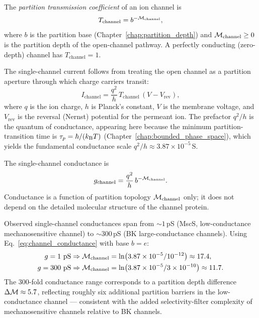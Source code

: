 \begin{definition}
\label{def:transmission_coefficient}
The \emph{partition transmission coefficient} of an ion channel is
\begin{equation}
  T_{\mathrm{channel}} = b^{-\mathcal{M}_{\mathrm{channel}}},
  \label{eq:transmission_coefficient}
\end{equation}
where $b$ is the partition base (Chapter~\ref{chap:partition_depth}) and
$\mathcal{M}_{\mathrm{channel}} \geq 0$ is the partition depth of the open-channel
pathway. A perfectly conducting (zero-depth) channel has $T_{\mathrm{channel}} = 1$.
\end{definition}

The single-channel current follows from treating the open channel as a partition
aperture through which charge carriers transit:
\begin{equation}
  \boxed{I_{\mathrm{channel}}
    = \frac{q^2}{h}\,T_{\mathrm{channel}}\,(V - V_{\mathrm{rev}}),}
  \label{eq:channel_current}
\end{equation}
where $q$ is the ion charge, $h$ is Planck's constant, $V$ is the membrane
voltage, and $V_{\mathrm{rev}}$ is the reversal (Nernst) potential for the
permeant ion. The prefactor $q^2/h$ is the quantum of conductance, appearing
here because the minimum partition-transition time is
$\tau_p = \hbar/(k_{\mathrm{B}} T)$ (Chapter~\ref{chap:bounded_phase_space}), which
yields the fundamental conductance scale
$q^2/h \approx 3.87 \times 10^{-5}$\,S.

\begin{corollary}
\label{cor:conductance}
The single-channel conductance is
\begin{equation}
  g_{\mathrm{channel}} = \frac{q^2}{h}\,b^{-\mathcal{M}_{\mathrm{channel}}}.
  \label{eq:channel_conductance}
\end{equation}
Conductance is a function of partition topology $\mathcal{M}_{\mathrm{channel}}$
only; it does not depend on the detailed molecular structure of the channel
protein.
\end{corollary}

\begin{remark}
Observed single-channel conductances span from $\sim 1$\,pS (MscS,
low-conductance mechanosensitive channel) to $\sim 300$\,pS (BK large-conductance
channels). Using Eq.~\eqref{eq:channel_conductance} with base $b = e$:
\begin{align}
  g = 1\ \mathrm{pS}   &\Rightarrow \mathcal{M}_{\mathrm{channel}} = \ln(3.87 \times 10^{-5}/10^{-12}) \approx 17.4,\\
  g = 300\ \mathrm{pS} &\Rightarrow \mathcal{M}_{\mathrm{channel}} = \ln(3.87 \times 10^{-5}/3\times10^{-10}) \approx 11.7.
\end{align}
The 300-fold conductance range corresponds to a partition depth difference
$\Delta\mathcal{M} \approx 5.7$, reflecting roughly six additional partition barriers
in the low-conductance channel --- consistent with the added selectivity-filter
complexity of mechanosensitive channels relative to BK channels.
\end{remark}

